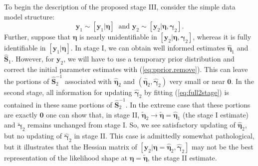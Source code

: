 \documentclass[12pt]{article}
\newcommand{\by}{\mathbf{y}}
\newcommand{\bn}{\boldsymbol{\eta}}
\newcommand{\bg}{\boldsymbol{\gamma}}
\newcommand{\bS}{\mathbf{S}}
\begin{document}
To begin the description of the proposed stage III, consider the simple data model structure:
\begin{equation}
\by_1 \sim [\by_1|\bn]\ \text{ and } \by_2 \sim [\by_2|\bn,\bg_2].
\end{equation} 
Further, suppose that $\bn$ is nearly unidentifiable in $[\by_2|\bn,\bg_2]$, whereas it is fully identifiable in $[\by_1|\bn]$. In stage I, we can obtain well informed estimates $\hat{\bn}_1$ and $\hat{\bS}_1$. However, for $\by_2$, we will have to use a temporary prior distribution and correct the initial parameter estimates with (\ref{eq:pprior.remove}). This can leave the portions of $\hat{\bS}_2^{-1}$ associated with $\hat{\bn}_2$ and $(\hat{\bn}_2, \hat{\bg}_2)$ very small or near $\mathbf{0}$. In the second stage, all information for updating $\hat{\bg}_2$ by fitting (\ref{eq:full2stage}) is contained in these same portions of $\hat{\bS}_2^{-1}$. In the extreme case that these portions are exactly $\mathbf{0}$ one can show that, in stage II, $\tilde{\bn}_2 \to \tilde{\bn} = \hat{\bn}_1$ (the stage I estimate) and $\tilde{\bg}_2$ remains unchanged from stage I. So, we see satisfactory updating of $\hat{\bn}_2$, but no updating of $\hat{\bg}_2$ in stage II. This case is admittedly somewhat pathological, but it illustrates that the Hessian matrix of $[\by_2|\bn=\hat{\bn}_2, \hat{\bg}_2]$ may not be the best representation of the likelihood shape at $\bn = \tilde{\bn}$, the stage II estimate. 
\end{document}
